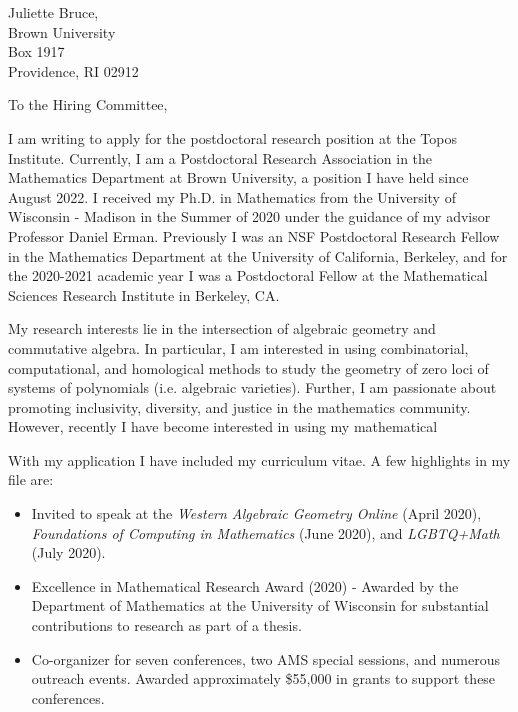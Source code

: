 \documentclass[11pt]{brownletter}
\date{April 18, 2023} %
\begin{document}
\begin{letter}{Juliette Bruce,\\ 
               Brown University\\ 
               Box 1917\\ 
               Providence, RI 02912}

\opening{To the Hiring Committee,}

I am writing to apply for the postdoctoral research position at the Topos Institute. Currently, I am a Postdoctoral Research Association in the Mathematics Department at Brown University, a position I have held since August 2022. I received my Ph.D. in Mathematics from the University of Wisconsin - Madison in the Summer of 2020 under the guidance of my advisor Professor Daniel Erman. Previously I was an NSF Postdoctoral Research Fellow in the Mathematics Department at the University of California, Berkeley, and for the 2020-2021 academic year I was a Postdoctoral Fellow at the Mathematical Sciences Research Institute in Berkeley, CA.

My research interests lie in the intersection of algebraic geometry and commutative algebra. In particular, I am interested in using combinatorial, computational, and homological methods to study the geometry of zero loci of systems of polynomials (i.e. algebraic varieties). Further, I am passionate about promoting inclusivity, diversity, and justice in the mathematics community. However, recently I have become interested in using my mathematical 

With my application I have included my curriculum vitae. A few highlights in my file are:
\begin{itemize}
\item Invited to speak at the \textit{Western Algebraic Geometry Online} (April 2020), \textit{Foundations of Computing in Mathematics} (June 2020), and \textit{LGBTQ+Math} (July 2020).

\item Excellence in Mathematical Research Award (2020) - Awarded by the Department of Mathematics at the University of Wisconsin for substantial contributions to research as part of a thesis. 

\item Co-organizer for seven conferences, two AMS special sessions, and numerous outreach events. Awarded approximately \$55,000 in grants to support these conferences.  


\end{itemize}
\end{letter}
\end{document}
